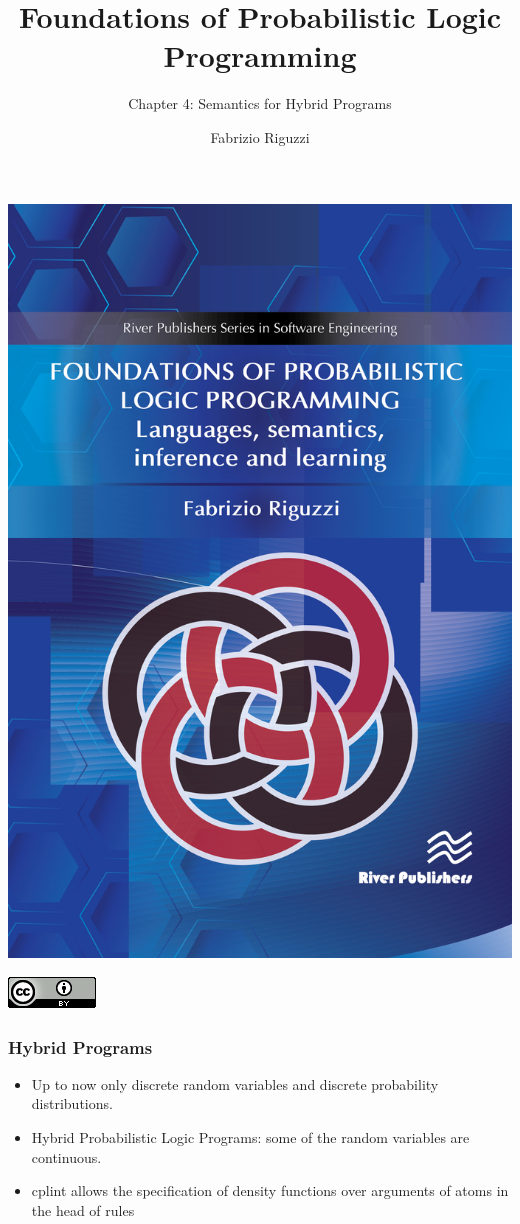 \documentclass[trans]{beamer}
\title[PLP - Ch 4]
{Foundations of Probabilistic Logic Programming}
\subtitle{Chapter 4: Semantics for Hybrid Programs}
\author[F. Riguzzi] %
{Fabrizio Riguzzi}
\institute[] %
{
}
\date{}
\begin{document}
\begin{frame}
\titlepage
\vspace{-2cm}
\begin{center}
\includegraphics[scale=0.120]{plp-book.jpg}

\includegraphics[scale=0.3]{cc-by.png}

\end{center}
\end{frame}



\begin{frame}
  \frametitle{Hybrid Programs}
\begin{itemize}
\item Up to now only discrete random variables and discrete probability distributions. 
\item Hybrid Probabilistic Logic Programs: some of the random variables are continuous.
\item cplint allows the specification of density functions over arguments of atoms in the head of rules
\end{itemize}
\end{frame}
\end{document}
